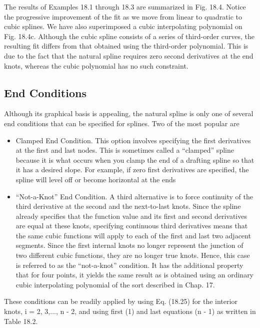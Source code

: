 \documentclass[../main.tex]{subfiles}
\begin{document}
\begin{exmp}
    The results of Examples 18.1 through 18.3 are summarized in Fig. 18.4. Notice the progressive improvement of the fit as we move from linear to quadratic to cubic splines. We
    have also superimposed a cubic interpolating polynomial on Fig. 18.4c. Although the cubic
    spline consists of a series of third-order curves, the resulting fit differs from that obtained
    using the third-order polynomial. This is due to the fact that the natural spline requires zero
    second derivatives at the end knots, whereas the cubic polynomial has no such constraint.

   \end{exmp}

   \subsection{End Conditions}
   Although its graphical basis is appealing, the natural spline is only one of several end conditions that can be specified for splines. Two of the most popular are
   \begin{itemize}
    \item Clamped End Condition. This option involves specifying the first derivatives at the first
    and last nodes. This is sometimes called a “clamped” spline because it is what occurs
    when you clamp the end of a drafting spline so that it has a desired slope. For example,
    if zero first derivatives are specified, the spline will level off or become horizontal at the
    ends
    \item “Not-a-Knot” End Condition. A third alternative is to force continuity of the third derivative at the second and the next-to-last knots. Since the spline already specifies that
    the function value and its first and second derivatives are equal at these knots, specifying continuous third derivatives means that the same cubic functions will apply to
    each of the first and last two adjacent segments. Since the first internal knots no longer
    represent the junction of two different cubic functions, they are no longer true knots.
    Hence, this case is referred to as the “not-a-knot” condition. It has the additional property that for four points, it yields the same result as is obtained using an ordinary cubic
    interpolating polynomial of the sort described in Chap. 17.
\end{itemize}
These conditions can be readily applied by using Eq. (18.25) for the interior knots,
i = 2, 3,..., n - 2, and using first (1) and last equations (n - 1) as written in Table 18.2.
\end{document}
